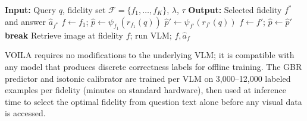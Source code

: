 \begin{algorithm}[tb]
\caption{\textsc{VOILA} Inference Procedure}
\label{alg:voila}
\small
\begin{algorithmic}[1]
\State \textbf{Input:} Query $q$, fidelity set $\mathcal{F}=\{f_1,\ldots,f_K\}$, $\lambda$, $\tau$
\State \textbf{Output:} Selected fidelity $f^*$ and answer $\hat{a}_{f^*}$
\State $f \gets f_1$;\; $\hat{p} \gets \psi_{f_1}(r_{f_1}(q))$ \hfill{}
    \State $\hat{p}' \gets \psi_{f'}(r_{f'}(q))$
        \State $f \gets f'$;\; $\hat{p} \gets \hat{p}'$
    \Else\; \textbf{break}
    \EndIf
\EndFor
\State Retrieve image at fidelity $f$; run VLM; \Return $f,\hat{a}_f$
\end{algorithmic}
\end{algorithm}

\textsc{VOILA} requires no modifications to the underlying VLM; it is compatible with any model that produces discrete correctness labels for offline training. The GBR predictor and isotonic calibrator are trained per VLM on 3,000--12,000 labeled examples per fidelity (minutes on standard hardware), then used at inference time to select the optimal fidelity from question text alone before any visual data is accessed.








